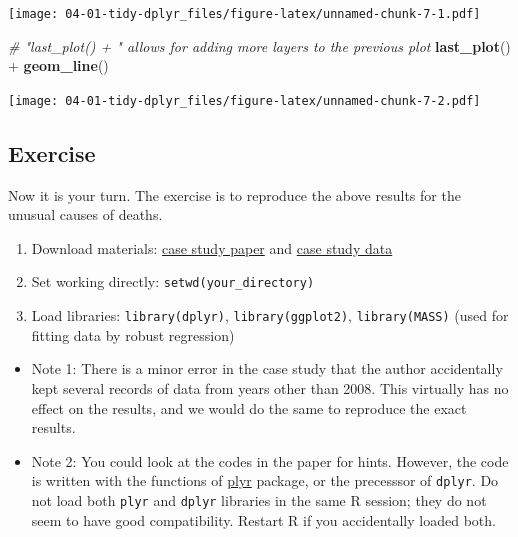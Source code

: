 \documentclass[]{book}
\newenvironment{Shaded}{\begin{snugshade}}{\end{snugshade}}
\newcommand{\KeywordTok}[1]{\textcolor[rgb]{0.13,0.29,0.53}{\textbf{{#1}}}}
\newcommand{\StringTok}[1]{\textcolor[rgb]{0.31,0.60,0.02}{{#1}}}
\newcommand{\CommentTok}[1]{\textcolor[rgb]{0.56,0.35,0.01}{\textit{{#1}}}}
\newcommand{\NormalTok}[1]{{#1}}
\theoremstyle{definition}
\theoremstyle{definition}
\theoremstyle{remark}
\begin{document}
\texttt{[image: 04-01-tidy-dplyr\_files/figure-latex/unnamed-chunk-7-1.pdf]}

\begin{Shaded}
\begin{Highlighting}[]
\CommentTok{# "last_plot() + " allows for adding more layers to the previous plot}
\KeywordTok{last_plot}\NormalTok{() +}\StringTok{ }\KeywordTok{geom_line}\NormalTok{()}
\end{Highlighting}
\end{Shaded}

\texttt{[image: 04-01-tidy-dplyr\_files/figure-latex/unnamed-chunk-7-2.pdf]}

\subsection*{Exercise}\label{exercise}

Now it is your turn. The exercise is to reproduce the above results for
the unusual causes of deaths.

\begin{enumerate}
\def\labelenumi{\arabic{enumi}.}
\item
  Download materials:
  \href{http://vita.had.co.nz/papers/tidy-data.html}{case study paper}
  and
  \href{https://github.com/kotamine/piecemealR/raw/master/tidy_case_study/tidy_case_study.RData}{case
  study data}
\item
  Set working directly: \texttt{setwd(your\_directory)}
\item
  Load libraries: \texttt{library(dplyr)}, \texttt{library(ggplot2)},
  \texttt{library(MASS)} (used for fitting data by robust regression)
\end{enumerate}

\begin{itemize}
\item
  Note 1: There is a minor error in the case study that the author
  accidentally kept several records of data from years other than 2008.
  This virtually has no effect on the results, and we would do the same
  to reproduce the exact results.
\item
  Note 2: You could look at the codes in the paper for hints. However,
  the code is written with the functions of
  \href{https://cran.r-project.org/web/packages/plyr/index.html}{plyr}
  package, or the precesssor of \texttt{dplyr}. Do not load both
  \texttt{plyr} and \texttt{dplyr} libraries in the same R session; they
  do not seem to have good compatibility. Restart R if you accidentally
  loaded both.
\end{itemize}
\end{document}
